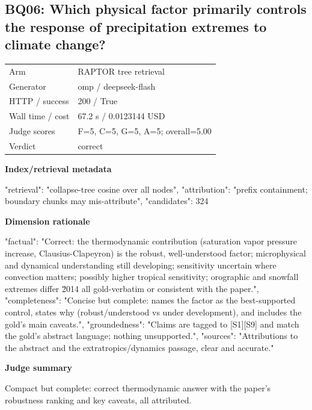 \documentclass[10pt]{article}
\begin{document}
\subsection{BQ06: Which physical factor primarily controls the response of precipitation extremes to climate change?}
\begin{tabular}{@{}ll@{}}
Arm & RAPTOR tree retrieval\\
Generator & omp / deepseek-flash\\
HTTP / success & 200 / True\\
Wall time / cost & 67.2 s / 0.0123144 USD\\
Judge scores & F=5, C=5, G=5, A=5; overall=5.00\\
Verdict & correct\\
\end{tabular}

\textbf{Index/retrieval metadata}
\begin{EvidenceText}
{
  "retrieval": "collapse-tree cosine over all nodes",
  "attribution": "prefix containment; boundary chunks may mis-attribute",
  "candidates": 324
}
\end{EvidenceText}

\textbf{Dimension rationale}
\begin{EvidenceText}
{
  "factual": "Correct: the thermodynamic contribution (saturation vapor pressure increase, Clausius-Clapeyron) is the robust, well-understood factor; microphysical and dynamical understanding still developing; sensitivity uncertain where convection matters; possibly higher tropical sensitivity; orographic and snowfall extremes differ \u2014 all gold-verbatim or consistent with the paper.",
  "completeness": "Concise but complete: names the factor as the best-supported control, states why (robust/understood vs under development), and includes the gold's main caveats.",
  "groundedness": "Claims are tagged to [S1][S9] and match the gold's abstract language; nothing unsupported.",
  "sources": "Attributions to the abstract and the extratropics/dynamics passage, clear and accurate."
}
\end{EvidenceText}

\textbf{Judge summary}
\begin{EvidenceText}
Compact but complete: correct thermodynamic answer with the paper's robustness ranking and key caveats, all attributed.
\end{EvidenceText}
\end{document}
